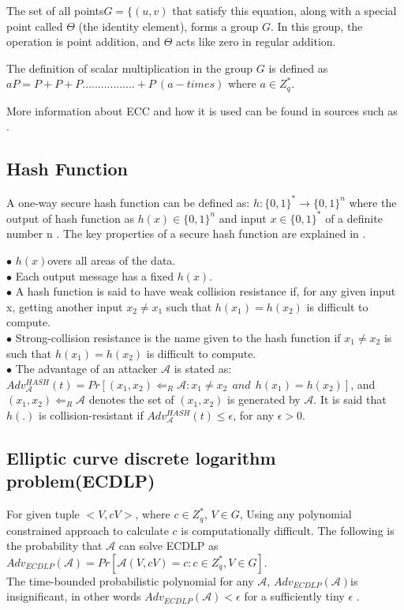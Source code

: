 \documentclass[3p,times,onecolumn]{elsarticle}
\begin{document}
The set of all points$G=\{(u,v)$ that satisfy this equation, along with a special point called $\Theta$ (the identity element), forms a group $G$. In this group, the operation is point addition, and $\Theta$ acts like zero in regular addition.

The definition of scalar multiplication in the group $G$ is defined as $aP=P+P+P.................+P~(a-times)$ where $a\in Z_{q}^{*}$.

More information about ECC and how it is used can be found in sources such as \cite{s44, ak01}.

\subsection{\textbf{Hash Function}}
A one-way secure hash function can be defined as:
$h: \{0,1\}^{*}\rightarrow \{0,1\}^{n}$ where the output of hash function as $h(x)\in \{0,1\}^{n}$ and input $x\in \{0,1\}^{*}$ of a definite number n \cite{s43,s45}. 
The key properties of a secure hash function are explained in \cite{s44}.


\textbf{$\bullet $ } $h(x)$overs all areas of the data.\\
\textbf{$\bullet $ }Each output message has a fixed $h(x)$.\\
\textbf{$\bullet $ } A hash function is said to have weak collision resistance if, for any given input x, getting another input $x_{2}\neq x_{1}$ such that $h(x_{1})=h(x_{2})$  is difficult to compute.\\
\textbf{$\bullet $ } Strong-collision resistance is the name given to the hash function if $x_{1}\neq x_{2}$ is such that $h(x_{1})=h(x_{2})$ is difficult to compute.\\
\textbf{$\bullet $ } The advantage of an attacker $\mathcal{A}$ is stated as:\\
$Adv_{\mathcal{A}}^{HASH}(t)=Pr[(x_{1},x_{2})\Leftarrow _{R}\mathcal{A}:x_{1}\neq x_{2} ~~and~~ h(x_{1})=h(x_{2})]$, and $(x_{1},x_{2}) \Leftarrow _{R}\mathcal{A}$ denotes the set of $(x_{1},x_{2})$ is generated by $\mathcal{A}$.  It is said that $h(.)$ is collision-resistant if $Adv_{\mathcal{A}}^{HASH}(t)\leq \epsilon$, for any $\epsilon>0$.

\subsection{\textbf{ Elliptic curve discrete logarithm problem(ECDLP)}}
For given tuple $<V, cV>$, where $c \in Z_{q}^{*}$, $V \in G$, Using any polynomial constrained approach to calculate $c$ is computationally difficult.
The following is the probability that $\mathcal{A}$ can solve ECDLP as $Adv_{ECDLP}(\mathcal{A})=Pr[\mathcal{A}(V,cV)=c: c\in Z_{q}^{*}, V\in G]$.\\
The time-bounded probabilistic polynomial for any $\mathcal{A}$, $Adv_{ECDLP}(\mathcal{A})$is insignificant, in other words $Adv_{ECDLP}(\mathcal{A})<\epsilon$ for a sufficiently tiny $\epsilon$ \cite{b7}.
\end{document}
